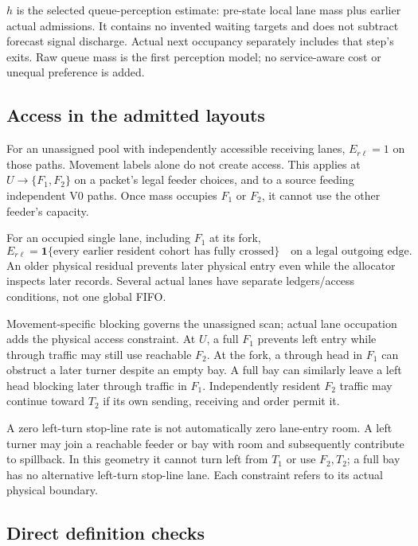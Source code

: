 \documentclass[10pt,a4paper]{article}
\begin{document}
$h$ is the selected queue-perception estimate: pre-state local lane mass
plus earlier actual admissions. It contains no invented waiting targets
and does not subtract forecast signal discharge. Actual next occupancy
separately includes that step's exits. Raw queue mass is the first
perception model; no service-aware cost or unequal preference is added.

\subsection*{Access in the admitted layouts}

For an unassigned pool with independently accessible receiving lanes,
$E_{r\ell}=1$ on those paths. Movement labels alone do not create access.
This applies at $U\to\{F_1,F_2\}$ on a packet's legal feeder choices,
and to a source feeding independent V0 paths. Once mass occupies $F_1$
or $F_2$, it cannot use the other feeder's capacity.

For an occupied single lane, including $F_1$ at its fork,
\begin{equation}
 E_{r\ell}
 =\mathbf1\{\text{every earlier resident cohort has fully crossed}\}
 \quad\text{on a legal outgoing edge}.
 \label{eq:physical-access}
\end{equation}
An older physical residual prevents later physical entry even while the
allocator inspects later records. Several actual lanes have separate
ledgers/access conditions, not one global FIFO.

Movement-specific blocking governs the unassigned scan; actual lane
occupation adds the physical access constraint. At $U$, a full $F_1$
prevents left entry while through traffic may still use reachable $F_2$.
At the fork, a through head in $F_1$ can obstruct a later turner despite
an empty bay. A full bay can similarly leave a left head blocking later
through traffic in $F_1$. Independently resident $F_2$ traffic may continue
toward $T_2$ if its own sending, receiving and order permit it.

A zero left-turn stop-line rate is not automatically zero lane-entry room.
A left turner may join a reachable feeder or bay with room and subsequently
contribute to spillback. In this geometry it cannot turn left from $T_1$
or use $F_2,T_2$; a full bay has no alternative left-turn stop-line lane.
Each constraint refers to its actual physical boundary.

\subsection*{Direct definition checks}
\end{document}
